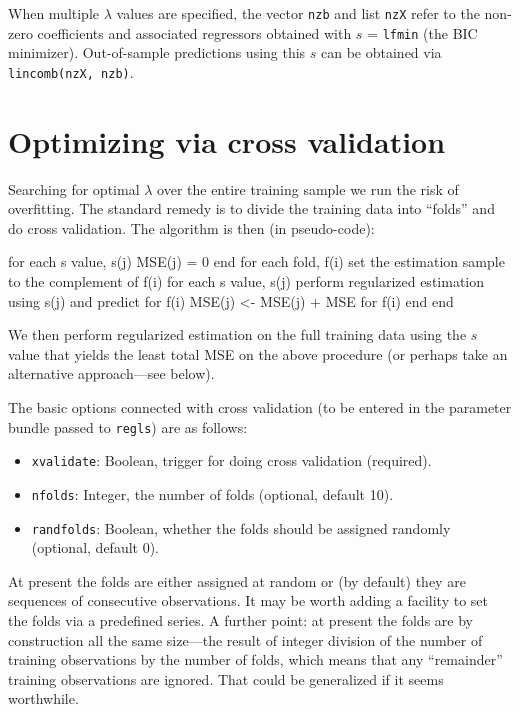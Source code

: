 \documentclass{article}
\begin{document}
When multiple $\lambda$ values are specified, the vector \texttt{nzb}
and list \texttt{nzX} refer to the non-zero coefficients and
associated regressors obtained with $s$ = \texttt{lfmin} (the BIC
minimizer). Out-of-sample predictions using this $s$ can be obtained
via \texttt{lincomb(nzX, nzb)}.

\section{Optimizing via cross validation}
\label{sec:xvalid}

Searching for optimal $\lambda$ over the entire training sample we run
the risk of overfitting. The standard remedy is to divide the training
data into ``folds'' and do cross validation. The algorithm is then (in
pseudo-code):
\begin{code}
for each s value, s(j)
  MSE(j) = 0
end
for each fold, f(i)
  set the estimation sample to the complement of f(i)
  for each s value, s(j)
    perform regularized estimation using s(j) and predict for f(i)
    MSE(j) <- MSE(j) + MSE for f(i)
  end
end
\end{code}
We then perform regularized estimation on the full training data using the
$s$ value that yields the least total MSE on the above procedure (or
perhaps take an alternative approach---see below).

The basic options connected with cross validation (to be entered in
the parameter bundle passed to \texttt{regls}) are as follows:
\begin{itemize}
\item \texttt{xvalidate}: Boolean, trigger for doing cross validation (required).
\item \texttt{nfolds}: Integer, the number of folds (optional, default
  10).
\item \texttt{randfolds}: Boolean, whether the folds should be
  assigned randomly (optional, default 0).
\end{itemize}

At present the folds are either assigned at random or (by default)
they are sequences of consecutive observations. It may be worth adding
a facility to set the folds via a predefined series. A further point:
at present the folds are by construction all the same size---the
result of integer division of the number of training observations by
the number of folds, which means that any ``remainder'' training
observations are ignored. That could be generalized if it seems
worthwhile.
\end{document}
